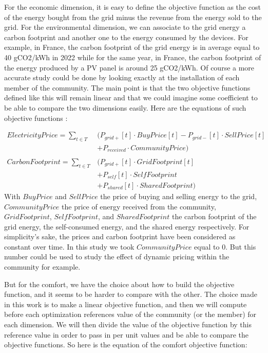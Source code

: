 For the economic dimension, it is easy to define the objective function as the cost of the energy bought from the grid minus the revenue from the energy sold to the grid. For the environmental dimension, we can associate to the grid energy a carbon footprint and another one to the energy consumed by the devices. For example, in France, the carbon footprint of the grid energy is in average equal to 40 gCO2/kWh in 2022 while for the same year, in France, the carbon footprint of the energy produced by a PV panel is around 25 gCO2/kWh. Of course a more accurate study could be done by looking exactly at the installation of each member of the community. The main point is that the two objective functions defined like this will remain linear and that we could imagine some coefficient to be able to compare the two dimensions easily. Here are the equations of such objective functions :

\begin{align}
    ElectricityPrice = \sum_{t \in T} &\big(P_{grid+}[t] \cdot BuyPrice[t] - P_{grid-}[t] \cdot SellPrice[t] 
        \nonumber \\&+ P_{received} \cdot CommunityPrice\big)  \\ \nonumber \\
    CarbonFootprint = \sum_{t \in T} &\big(P_{grid+}[t] \cdot GridFootprint[t] \nonumber \\
    &+ P_{self}[t] \cdot SelfFootprint 
        \nonumber\\
        &+ P_{shared}[t] \cdot SharedFootprint\big)
\end{align}
With $BuyPrice$ and $SellPrice$ the price of buying and selling energy to the grid, $CommunityPrice$ the price of energy received from the community, $GridFootprint$, $SelfFootprint$, and $SharedFootprint$ the carbon footprint of the grid energy, the self-consumed energy, and the shared energy respectively. For simplicity's sake, the prices and carbon footprint have been considered as constant over time. In this study we took $CommunityPrice$ equal to 0. But this number could be used to study the effect of dynamic pricing within the community for example.


But for the comfort, we have the choice about how to build the objective function, and it seems to be harder to compare with the other. The choice made in this work is to make a linear objective function, and then we will compute before each optimization references value of the community (or the member) for each dimension. We will then divide the value of the objective function by this reference value in order to pass in per unit values and be able to compare the objective functions. So here is the equation of the comfort objective function:

